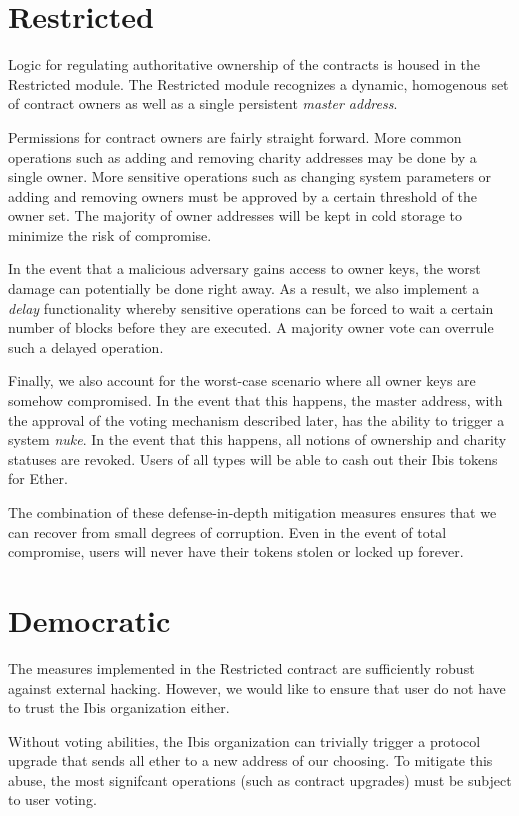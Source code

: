 \documentclass{article}
\begin{document}
\section{Restricted}

Logic for regulating authoritative ownership of the contracts is housed in the
Restricted module. The Restricted module recognizes a dynamic, homogenous set of
contract owners as well as a single persistent \emph{master address}.

Permissions for contract owners are fairly straight forward. More common
operations such as adding and removing charity addresses may be done by a single
owner. More sensitive operations such as changing system parameters or adding
and removing owners must be approved by a certain threshold of the owner
set. The majority of owner addresses will be kept in cold storage to minimize
the risk of compromise.

In the event that a malicious adversary gains access to owner keys, the worst
damage can potentially be done right away. As a result, we also implement a
\emph{delay} functionality whereby sensitive operations can be forced to wait
a certain number of blocks before they are executed. A majority owner vote can
overrule such a delayed operation.

Finally, we also account for the worst-case scenario where all owner keys are
somehow compromised. In the event that this happens, the master address, with
the approval of the voting mechanism described later, has the ability to trigger
a system \emph{nuke}. In the event that this happens, all notions of ownership
and charity statuses are revoked. Users of all types will be able to cash out
their Ibis tokens for Ether.

The combination of these defense-in-depth mitigation measures ensures that we
can recover from small degrees of corruption. Even in the event of total
compromise, users will never have their tokens stolen or locked up forever.

\section{Democratic}

The measures implemented in the Restricted contract are sufficiently robust
against external hacking. However, we would like to ensure that user do not have
to trust the Ibis organization either.

Without voting abilities, the Ibis organization can trivially trigger a protocol
upgrade that sends all ether to a new address of our choosing. To mitigate this
abuse, the most signifcant operations (such as contract upgrades) must be
subject to user voting.
\end{document}

